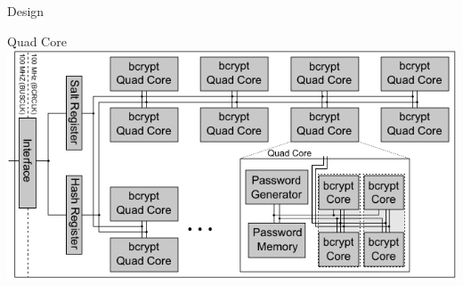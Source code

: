 \begin{frame}{Design}
	\begin{block}{Quad Core}
		\center \includegraphics[width=.90\textwidth]{data/bcrypt_design_overview.pdf}
	\end{block}
\end{frame}




